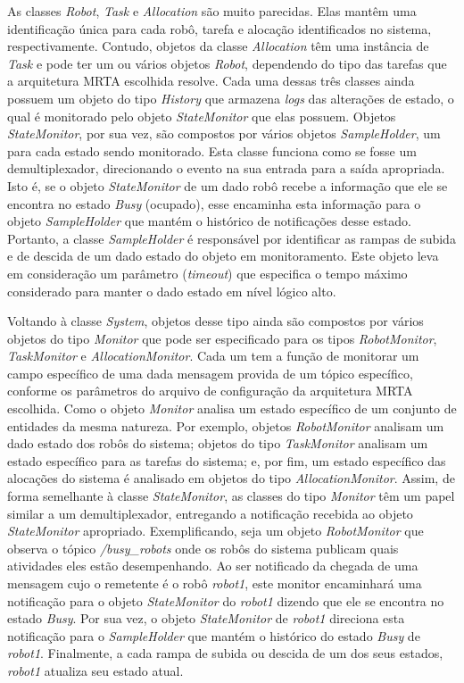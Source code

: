         As classes \textit{Robot}, \textit{Task} e \textit{Allocation} são muito parecidas. Elas mantêm uma identificação única para cada robô, tarefa e alocação identificados no sistema, respectivamente. Contudo, objetos da classe \textit{Allocation} têm uma instância de \textit{Task} e pode ter um ou vários objetos \textit{Robot}, dependendo do tipo das tarefas que a arquitetura MRTA escolhida resolve. Cada uma dessas três classes ainda possuem um objeto do tipo \textit{History} que armazena \textit{logs} das alterações de estado, o qual é monitorado pelo objeto \textit{StateMonitor} que elas possuem. Objetos \textit{StateMonitor}, por sua vez, são compostos por vários objetos \textit{SampleHolder}, um para cada estado sendo monitorado. Esta classe funciona como se fosse um demultiplexador, direcionando o evento na sua entrada para a saída apropriada. Isto é, se o objeto \textit{StateMonitor} de um dado robô recebe a informação que ele se encontra no estado \textit{Busy} (ocupado), esse encaminha esta informação para o objeto \textit{SampleHolder} que mantém o histórico de notificações desse estado. Portanto, a classe \textit{SampleHolder} é responsável por identificar as rampas de subida e de descida de um dado estado do objeto em monitoramento. Este objeto leva em consideração um parâmetro (\textit{timeout}) que especifica o tempo máximo considerado para manter o dado estado em nível lógico alto.
        
        Voltando à classe \textit{System}, objetos desse tipo ainda são compostos por vários objetos do tipo \textit{Monitor} que pode ser especificado para os tipos \textit{RobotMonitor}, \textit{TaskMonitor} e \textit{AllocationMonitor}. Cada um tem a função de monitorar um campo específico de uma dada mensagem provida de um tópico específico, conforme os parâmetros do arquivo de configuração da arquitetura MRTA escolhida.  Como o objeto \textit{Monitor} analisa um estado específico de um conjunto de entidades da mesma natureza. Por exemplo, objetos \textit{RobotMonitor} analisam um dado estado dos robôs do sistema; objetos do tipo \textit{TaskMonitor} analisam um estado específico para as tarefas do sistema; e, por fim, um estado específico das alocações do sistema é analisado em objetos do tipo \textit{AllocationMonitor}. Assim, de forma semelhante à classe \textit{StateMonitor}, as classes do tipo \textit{Monitor} têm um papel similar a um demultiplexador, entregando a notificação recebida ao objeto \textit{StateMonitor} apropriado. Exemplificando, seja um objeto \textit{RobotMonitor} que observa o tópico \textit{/busy\_robots} onde os robôs do sistema publicam quais atividades eles estão desempenhando. Ao ser notificado da chegada de uma mensagem cujo o remetente é o robô \textit{robot1}, este monitor encaminhará uma notificação para o objeto \textit{StateMonitor} do \textit{robot1} dizendo que ele se encontra no estado \textit{Busy}. Por sua vez, o objeto \textit{StateMonitor} de \textit{robot1} direciona esta notificação para o \textit{SampleHolder} que mantém o histórico do estado \textit{Busy} de \textit{robot1}. Finalmente, a cada rampa de subida ou descida de um dos seus estados, \textit{robot1} atualiza seu estado atual.
        
